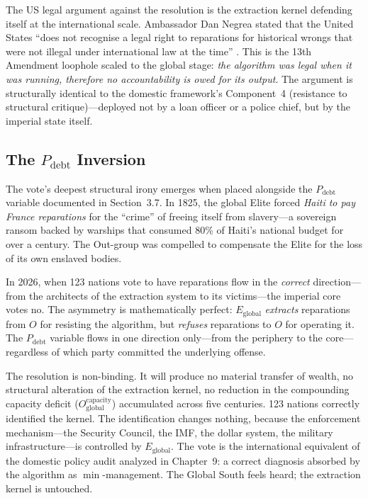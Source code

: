 \documentclass[12pt,openany]{book}
\begin{document}
The US legal argument against the resolution is the extraction kernel defending itself at the international scale. Ambassador Dan Negrea stated that the United States ``does not recognise a legal right to reparations for historical wrongs that were not illegal under international law at the time'' \cite{unreparations2026}. This is the 13th Amendment loophole scaled to the global stage: \textit{the algorithm was legal when it was running, therefore no accountability is owed for its output}. The argument is structurally identical to the domestic framework's Component~4 (resistance to structural critique)---deployed not by a loan officer or a police chief, but by the imperial state itself.

\subsection{The \texorpdfstring{$P_{\text{debt}}$}{P\_debt} Inversion}

The vote's deepest structural irony emerges when placed alongside the $P_{\text{debt}}$ variable documented in Section~3.7. In 1825, the global Elite forced \textit{Haiti to pay France reparations} for the ``crime'' of freeing itself from slavery---a sovereign ransom backed by warships that consumed 80\% of Haiti's national budget for over a century. The Out-group was compelled to compensate the Elite for the loss of its own enslaved bodies.

In 2026, when 123 nations vote to have reparations flow in the \textit{correct} direction---from the architects of the extraction system to its victims---the imperial core votes no. The asymmetry is mathematically perfect: $E_{\text{global}}$ \textit{extracts} reparations from $O$ for resisting the algorithm, but \textit{refuses} reparations to $O$ for operating it. The $P_{\text{debt}}$ variable flows in one direction only---from the periphery to the core---regardless of which party committed the underlying offense.

The resolution is non-binding. It will produce no material transfer of wealth, no structural alteration of the extraction kernel, no reduction in the compounding capacity deficit ($O_{\text{global}}^{\text{capacity}}$) accumulated across five centuries. 123 nations correctly identified the kernel. The identification changes nothing, because the enforcement mechanism---the Security Council, the IMF, the dollar system, the military infrastructure---is controlled by $E_{\text{global}}$. The vote is the international equivalent of the domestic policy audit analyzed in Chapter~9: a correct diagnosis absorbed by the algorithm as $\min$-management. The Global South feels heard; the extraction kernel is untouched.
\end{document}
